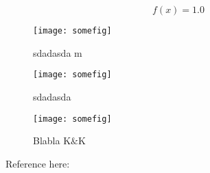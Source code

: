 \documentclass{memoir}
\begin{document}
\begin{equation}
  f(x) = 1.0
  \label{eq:eq1}
\end{equation}

\begin{figure}[tbp]
  \centering
  \texttt{[image: somefig]}
  \caption{sdadasda \si{\m}}
  \label{fig:fig1}
\end{figure}

\begin{figure}[tbp]
  \centering
  \texttt{[image: somefig]}
  \caption{sdadasda}
  \label{fig:fig2}
\end{figure}

\begin{figure}[tbp]
  \centering
  \texttt{[image: somefig]}
  \caption{Blabla \(\text{K\&K}\) }
  \label{fig:fig3-for-issue-337}
\end{figure}

Reference here:
\end{document}
